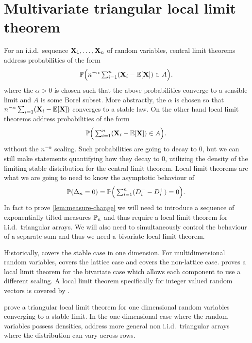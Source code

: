 \section{Multivariate triangular local limit theorem}
\label{chap:llt}

For an i.i.d.\ sequence $\vX_1, \ldots, \vX_n$ of random variables, central limit theorems address probabilities of the form
\begin{equation*}
    \P\Big( n^{-\alpha} \textstyle \sum_{i=1}^n (\vX_i - \E[\vX]) \in A \Big).
\end{equation*}
where the $\alpha > 0$ is chosen such that the above probabilities converge to a sensible limit and $A$ is some Borel subset. More abstractly, the $\alpha$ is chosen so that $n^{-\alpha} \sum_{i=1} (\vX_i - \E[\vX])$ converges to a stable law. On the other hand local limit theorems address probabilities of the form
\begin{equation*}
    \P\Big( \textstyle \sum_{i=1}^n (\vX_i - \E[\vX]) \in A \Big).
\end{equation*}
without the $n^{-\alpha}$ scaling. Such probabilities are going to decay to 0, but we can still make statements quantifying how they decay to 0, utilizing the density of the limiting stable distribution for the central limit theorem. Local limit theorems are what we are going to need to know the asymptotic behaviour of
\begin{equation*}
    \P(\Delta_n = 0) = \P\Big(\textstyle\sum_{i=1}^n (D_i^- - D_i^+) = 0\Big).
\end{equation*}
In fact to prove \cref{lem:measure-change} we will need to introduce a sequence of exponentially tilted measures $\P_n$ and thus require a local limit theorem for i.i.d.\ triangular arrays. We will also need to simultaneously control the behaviour of a separate sum and thus we need a bivariate local limit theorem.

Historically, \citet{gnedenkoLocalLimitTheorem1948} covers the stable case in one dimension. For multidimensional random variables, \citet{rvavceva1962domains} covers the lattice case and \citet{stoneLocalLimitTheorem1965} covers the non-lattice case. \citet{doneyBivariateLocalLimit1991} proves a local limit theorem for the bivariate case which allows each component to use a different scaling. A local limit theorem specifically for integer valued random vectors is covered by \citet{gamkrelidzeLocalLimitTheorem2015}.

\citet{jainLowerTailProbability1987} prove a triangular local limit theorem for one dimensional random variables converging to a stable limit. In the one-dimensional case where the random variables possess densities, \citet{korchinskyLocalLimitTheorem2007} address more general non i.i.d.\ triangular arrays where the distribution can vary across rows.

